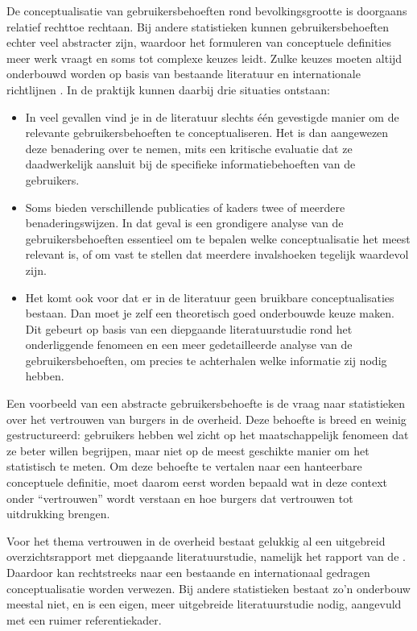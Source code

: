 \documentclass[\mainfiledir/00_handleiding_statistiekproductie.tex]{subfiles}
\begin{document}
De conceptualisatie van gebruikersbehoeften rond bevolkingsgrootte is doorgaans relatief rechttoe rechtaan. Bij andere statistieken kunnen gebruikersbehoeften echter veel abstracter zijn, waardoor het formuleren van conceptuele definities meer werk vraagt en soms tot complexe keuzes leidt. Zulke keuzes moeten altijd onderbouwd worden op basis van bestaande literatuur en internationale richtlijnen \parencite{UNSD2025Handbook}. In de praktijk kunnen daarbij drie situaties ontstaan:
\begin{itemize}
\item In veel gevallen vind je in de literatuur slechts één gevestigde manier om de relevante gebruikersbehoeften te conceptualiseren. Het is dan aangewezen deze benadering over te nemen, mits een kritische evaluatie dat ze daadwerkelijk aansluit bij de specifieke informatiebehoeften van de gebruikers.
\item Soms bieden verschillende publicaties of kaders twee of meerdere benaderingswijzen. In dat geval is een grondigere analyse van de gebruikersbehoeften essentieel om te bepalen welke conceptualisatie het meest relevant is, of om vast te stellen dat meerdere invalshoeken tegelijk waardevol zijn.
\item Het komt ook voor dat er in de literatuur geen bruikbare conceptualisaties bestaan. Dan moet je zelf een theoretisch goed onderbouwde keuze maken. Dit gebeurt op basis van een diepgaande literatuurstudie rond het onderliggende fenomeen en een meer gedetailleerde analyse van de gebruikersbehoeften, om precies te achterhalen welke informatie zij nodig hebben. 
\end{itemize}

Een voorbeeld van een abstracte gebruikersbehoefte is de vraag naar statistieken over het vertrouwen van burgers in de overheid. Deze behoefte is breed en weinig gestructureerd: gebruikers hebben wel zicht op het maatschappelijk fenomeen dat ze beter willen begrijpen, maar niet op de meest geschikte manier om het statistisch te meten. Om deze behoefte te vertalen naar een hanteerbare conceptuele definitie, moet daarom eerst worden bepaald wat in deze context onder ``vertrouwen'' wordt verstaan en hoe burgers dat vertrouwen tot uitdrukking brengen.

Voor het thema vertrouwen in de overheid bestaat gelukkig al een uitgebreid overzichtsrapport met diepgaande literatuurstudie, namelijk het rapport van de \textcite{oecd2017trust}. Daardoor kan rechtstreeks naar een bestaande en internationaal gedragen conceptualisatie worden verwezen. Bij andere statistieken bestaat zo’n onderbouw meestal niet, en is een eigen, meer uitgebreide literatuurstudie nodig, aangevuld met een ruimer referentiekader.
\end{document}

